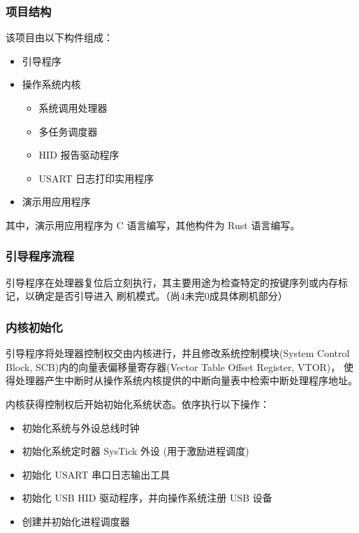 \documentclass[aspectratio=169]{beamer}
\begin{document}
\begin{frame}
    \frametitle{项目结构}
    
    该项目由以下构件组成：

    \begin{itemize}
        \item 引导程序
        \item 操作系统内核
        \begin{itemize}
            \item 系统调用处理器
            \item 多任务调度器
            \item HID 报告驱动程序
            \item USART 日志打印实用程序
        \end{itemize}
        \item 演示用应用程序
    \end{itemize}

    其中，演示用应用程序为 C 语言编写，其他构件为 Rust 语言编写。
\end{frame}

\begin{frame}
    \frametitle{引导程序流程}

    引导程序在处理器复位后立刻执行，其主要用途为检查特定的按键序列或内存标记，以确定是否引导进入
    刷机模式。（尚4未完0成具体刷机部分）
    
    \vspace{1em}

\end{frame}

\begin{frame}
    \frametitle{内核初始化}

    引导程序将处理器控制权交由内核进行，并且修改系统控制模块(System Control Block, SCB)内的向量表偏移量寄存器(Vector Table Offset Register, VTOR)，
    使得处理器产生中断时从操作系统内核提供的中断向量表中检索中断处理程序地址。
    \par
    内核获得控制权后开始初始化系统状态。依序执行以下操作：
    \begin{itemize}
        \item 初始化系统与外设总线时钟
        \item 初始化系统定时器 SysTick 外设 (用于激励进程调度)
        \item 初始化 USART 串口日志输出工具
        \item 初始化 USB HID 驱动程序，并向操作系统注册 USB 设备
        \item 创建并初始化进程调度器
    \end{itemize}
\end{frame}

\begin{frame}
    
\end{frame}
\end{document}
